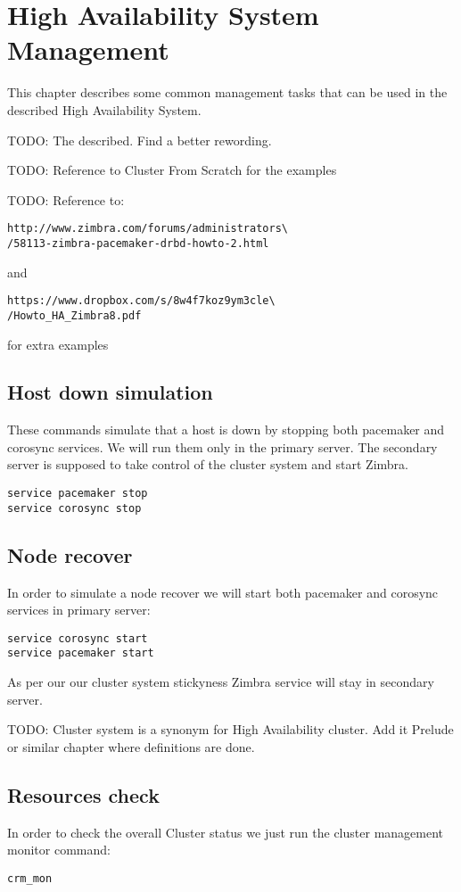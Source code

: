 

\chapter{High Availability System Management}
This chapter describes some common management tasks that can be used in the described High Availability System.

TODO: The described. Find a better rewording.


TODO: Reference to Cluster From Scratch for the examples

TODO: Reference to:
\begin{verbatim}
http://www.zimbra.com/forums/administrators\
/58113-zimbra-pacemaker-drbd-howto-2.html
\end{verbatim}
and
\begin{verbatim}
https://www.dropbox.com/s/8w4f7koz9ym3cle\
/Howto_HA_Zimbra8.pdf
\end{verbatim}
for extra examples

\section {Host down simulation}
These commands simulate that a host is down by stopping both pacemaker and corosync services. We will run them only in the primary server. The secondary server is supposed to take control of the cluster system and start Zimbra.

\begin{verbatim}
service pacemaker stop
service corosync stop
\end{verbatim}

\section {Node recover}
In order to simulate a node recover we will start both pacemaker and corosync services in primary server:
\begin{verbatim}
service corosync start
service pacemaker start
\end{verbatim}

As per our our cluster system stickyness Zimbra service will stay in secondary server.


TODO: Cluster system is a synonym for High Availability cluster. Add it Prelude or similar chapter where definitions are done.

\section {Resources check}
In order to check the overall Cluster status we just run the cluster management monitor command:
\begin{verbatim}
crm_mon
\end{verbatim}

